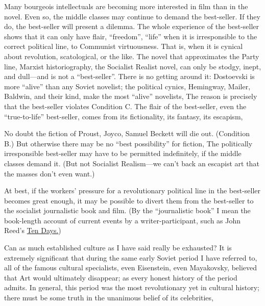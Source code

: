 Many bourgeois intellectuals are becoming more interested in film than in the novel. Even so, the middle classes may continue to demand the best-seller. If they do, the best-seller will present a dilemma. The whole experience of the best-seller shows that it can only have flair, \enquote{freedom}, \enquote{life} when it is irresponsible to the correct political line, to Communist virtuousness. That is, when it is cynical about revolution, scatological, or the like. The novel that approximates the Party line, Marxist historiography, the Socialist Realist novel, can only be stodgy, inept, and dull---and is not a \enquote{best-seller}. There is no getting around it: Dostoevski is more \enquote{alive} than any Soviet novelist; the political cynics, Hemingway, Mailer, Baldwin, and their kind, make the most \enquote{alive} novelists, The reason is precisely that the best-seller violates Condition C. The flair of the best-seller, even the \enquote{true-to-life} best-seller, comes from its fictionality, its fantasy, its escapism, 

No doubt the fiction of Proust, Joyco, Samuel Beckett will die out. (Condition B.) But otherwise there may be no \enquote{best possibility} for fiction, The politically irresponsible best-seller may have to be permitted indefinitely, if the middle classes demand it. (But not Socialist Realism---we can't back an escapist art that the masses don't even want.)

At best, if the workers' pressure for a revolutionary political line in the best-seller becomes great enough, it may be possible to divert them from the best-seller to the socialist journalistic book and film. (By the \enquote{journalistic book} I mean the book-length account of current events by a writer-participant, such as John Reed's \uline{Ten Days.}) 


Can as much established culture as I have said really be exhausted? It is extremely significant that during the same early Soviet period I have referred to, all of the famous cultural specialists, even Eisenstein, even Mayakovsky, believed that Art would ultimately disappear; as every honest history of the period admits. In general, this period was the most revolutionary yet in cultural history; there must be some truth in the unanimous belief of its celebrities, 

